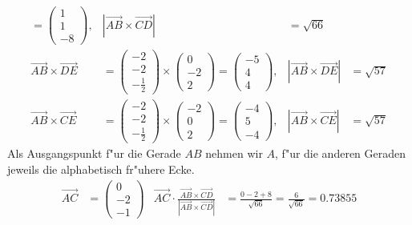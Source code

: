 \begin{loesung}
\begin{align*}
=
\begin{pmatrix}
1\\1\\-8
\end{pmatrix},
&
|\overrightarrow{AB}\times\overrightarrow{CD}|
&=
\sqrt{66}
\\
\overrightarrow{AB}\times\overrightarrow{DE}
&=
\begin{pmatrix} -2\\-2\\-\frac12 \end{pmatrix}
\times
\begin{pmatrix} 0\\-2\\2\end{pmatrix}
=
\begin{pmatrix} -5\\4\\4\end{pmatrix},
&
|\overrightarrow{AB}\times\overrightarrow{DE}|
&=
\sqrt{57}
\\
\overrightarrow{AB}\times\overrightarrow{CE}
&=
\begin{pmatrix} -2\\-2\\-\frac12 \end{pmatrix}
\times
\begin{pmatrix} -2\\0\\2\end{pmatrix}
=
\begin{pmatrix} -4\\5\\-4\end{pmatrix},
&
|\overrightarrow{AB}\times\overrightarrow{CE}|
&=
\sqrt{57}
\end{align*}
Als Ausgangspunkt f"ur die Gerade $AB$ nehmen wir $A$, f"ur
die anderen Geraden jeweils die alphabetisch fr"uhere Ecke.
\begin{align*}
\overrightarrow{AC}
&=
\begin{pmatrix}0\\-2\\-1\end{pmatrix}
&
\overrightarrow{AC}
\cdot
\frac{\overrightarrow{AB}\times\overrightarrow{CD}}{|\overrightarrow{AB}\times\overrightarrow{CD}|}
&=
\frac{0-2+8}{\sqrt{66}}=\frac6{\sqrt{66}}=0.73855
\\

\end{align*}
\end{loesung}
